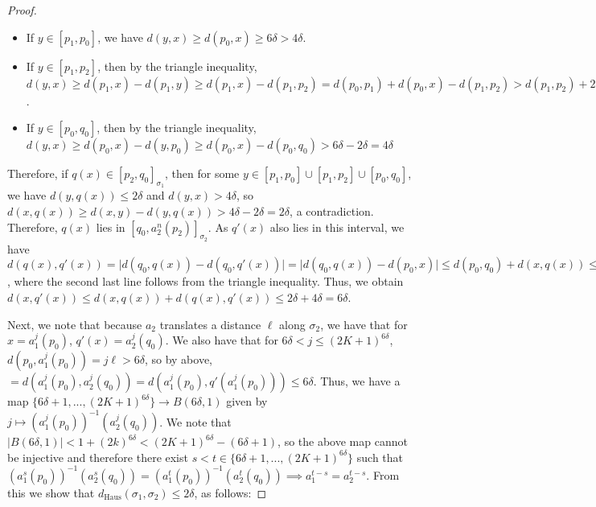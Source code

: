 \documentclass[12pt]{article}
\newcommand{\vs}{\vskip10pt}
\begin{document}
\begin{proof}
		
		\begin{itemize}
			\item If $y \in [p_1, p_0]$, we have $d(y,x) \geq d(p_0, x) \geq 6 \delta > 4 \delta$.
			\item If $y \in [p_1, p_2]$, then by the triangle inequality, $d(y,x) \geq d(p_1, x) - d(p_1, y) \geq d(p_1, x) - d(p_1, p_2) = d(p_0, p_1) + d(p_0, x) - d(p_1, p_2) > d(p_1, p_2) + 2 \delta + 6 \delta - d(p_1, p_2) = 8 \delta$.
			\item If $y \in [p_0, q_0]$, then by the triangle inequality, $d(y,x) \geq d(p_0, x) - d(y, p_0) \geq d(p_0, x) - d(p_0, q_0) > 6 \delta - 2 \delta = 4 \delta$
		\end{itemize}
		
		
		Therefore, if $q(x) \in [p_2, q_0]_{\sigma_1}$, then for some $y \in [p_1,p_0] \cup [p_1, p_2] \cup [p_0, q_0]$, we have $d(y, q(x)) \leq 2 \delta$ and $d(y, x) > 4 \delta$, so $d(x, q(x)) \geq d(x, y) - d(y, q(x)) > 4 \delta - 2 \delta = 2 \delta$, a contradiction. Therefore, $q(x)$ lies in $[q_0, a_2^n (p_2)]_{\sigma_2}$. As $q'(x)$ also lies in this interval, we have $d(q(x), q'(x)) = \vert d(q_0, q(x)) - d(q_0, q'(x)) \vert = \vert d(q_0, q(x)) - d(p_0, x) \vert \leq d(p_0, q_0) + d(x, q(x)) \leq 4 \delta$, where the second last line follows from the triangle inequality. Thus, we obtain $d(x, q'(x)) \leq d(x, q(x)) + d(q(x), q'(x)) \leq 2 \delta + 4\delta = 6 \delta$. 
		
		\vs 
		
		Next, we note that because $a_2$ translates a distance $\ell$ along $\sigma_2$, we have that for $x = a_1^j (p_0)$, $q'(x) = a_2^j (q_0)$. We also have that for $6\delta < j \leq (2K+1)^{6\delta}$, $d(p_0, a_1^j (p_0)) = j \ell > 6 \delta$, so by above, $= d(a_1^j (p_0), a_2^j (q_0)) = d(a_1^j (p_0), q'(a_1^j (p_0))) \leq 6 \delta$. Thus, we have a map $\{6 \delta + 1, ..., (2K+1)^{6\delta}\} \rightarrow B(6 \delta, 1)$ given by $j \mapsto (a_1^j (p_0))^{-1}(a_2^j(q_0))$. We note that $\vert B(6 \delta, 1) \vert < 1 + (2k)^{6 \delta} < (2K+1)^{6 \delta} - (6 \delta + 1)$, so the above map cannot be injective and therefore there exist $s < t \in \{6 \delta + 1, ..., (2K+1)^{6\delta}\}$ such that $(a_1^s (p_0))^{-1}(a_2^s(q_0)) = (a_1^t (p_0))^{-1}(a_2^t(q_0)) \implies a_1^{t-s} = a_2^{t-s}$. From this we show that $d_{\text{Haus}}(\sigma_1, \sigma_2) \leq 2 \delta$, as follows: 
		

\end{proof}
\end{document}

